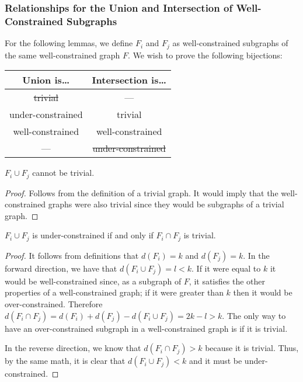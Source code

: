 
\subsubsection{Relationships for the Union and Intersection of Well-Constrained Subgraphs}
For the following lemmas, we define $F_i$ and $F_j$ as well-constrained subgraphs of the same well-constrained graph $F$.
We wish to prove the following bijections:

\begin{center}
\begin{tabular}{|c|c|}
\hline
\textbf{Union is\ldots} & \textbf{Intersection is\ldots} \\ \hline
\sout{trivial}          & --- \\ \hline
under-constrained       & trivial \\ \hline
well-constrained        & well-constrained \\ \hline
---                     & \sout{under-constrained} \\ \hline
\end{tabular}
\end{center}


\begin{lemma}\label{t-l1}
$F_i\cup F_j$ cannot be trivial.
\end{lemma}

\begin{proof}

Follows from the definition of a trivial graph. It would imply that the well-constrained graphs were also trivial since they would be subgraphs of a trivial graph.
\end{proof}


\begin{lemma}\label{uc-l1}
$F_i\cup F_j$ is under-constrained if and only if $F_i\cap F_j$ is trivial.
\end{lemma}

\begin{proof}
It follows from definitions that $d(F_i)=k$ and $d(F_j)=k$. In the forward direction, we have that $d(F_i\cup F_j)=l<k$. If it were equal to $k$ it would be well-constrained since, as a subgraph of $F$, it satisfies the other properties of a well-constrained graph; if it were greater than $k$ then it would be over-constrained. Therefore $d(F_i\cap F_j)=d(F_i)+d(F_j)-d(F_i\cup F_j)=2k-l>k$. The only way to have an over-constrained subgraph in a well-constrained graph is if it is trivial.

In the reverse direction, we know that $d(F_i\cap F_j)>k$ because it is trivial. Thus, by the same math, it is clear that $d(F_i\cup F_j)<k$ and it must be under-constrained.
\end{proof}


